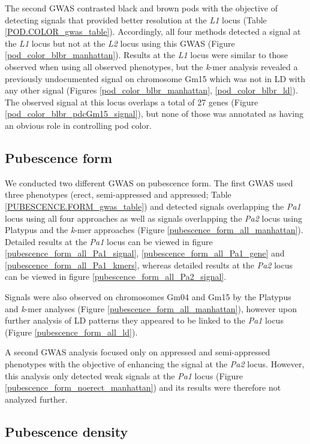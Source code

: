 The second GWAS contrasted black and brown pods with the objective of detecting
signals that provided better resolution at the \emph{L1} locus (Table
\ref{POD.COLOR_gwas_table}).  Accordingly, all four methods detected a signal
at the \emph{L1} locus but not at the \emph{L2} locus using this GWAS (Figure
\ref{pod_color_blbr_manhattan}).  Results at the \emph{L1} locus were similar
to those observed when using all observed phenotypes, but the \emph{k}-mer
analysis revealed a previously undocumented signal on chromosome Gm15 which was
not in LD with any other signal (Figures \ref{pod_color_blbr_manhattan},
\ref{pod_color_blbr_ld}). The observed signal at this locus overlaps a total of
27 genes (Figure \ref{pod_color_blbr_pdcGm15_signal}), but none of those was
annotated as having an obvious role in controlling pod color.

\subsection*{Pubescence form}
\label{sv-gwas-pubesence-form}

We conducted two different GWAS on pubescence form. The first GWAS used three
phenotypes (erect, semi-appressed and appressed; Table
\ref{PUBESCENCE.FORM_gwas_table}) and detected signals overlapping the
\emph{Pa1} locus using all four approaches as well as signals overlapping the
\emph{Pa2} locus using Platypus and the \emph{k}-mer approaches (Figure
\ref{pubescence_form_all_manhattan}). Detailed results at the \textit{Pa1} locus
can be viewed in figure \ref{pubescence_form_all_Pa1_signal},
\ref{pubescence_form_all_Pa1_gene} and \ref{pubescence_form_all_Pa1_kmers},
whereas detailed results at the \textit{Pa2} locus can be viewed in figure
\ref{pubescence_form_all_Pa2_signal}.

Signals were also observed on chromosomes Gm04 and Gm15 by the Platypus and
\emph{k}-mer analyses (Figure \ref{pubescence_form_all_manhattan}), however
upon further analysis of LD patterns they appeared to be linked to the
\emph{Pa1} locus (Figure \ref{pubescence_form_all_ld}).

A second GWAS analysis focused only on appressed and semi-appressed phenotypes
with the objective of enhancing the signal at the \emph{Pa2} locus. However,
this analysis only detected weak signals at the \emph{Pa1} locus (Figure
\ref{pubescence_form_noerect_manhattan}) and its results were therefore not
analyzed further.

\subsection*{Pubescence density}
\label{sv-gwas-pubescence-density}

